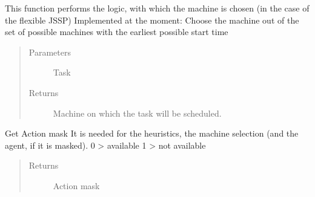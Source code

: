 \documentclass[letterpaper,10pt,english]{sphinxmanual}
\begin{document}
\begin{fulllineitems}
\begin{fulllineitems}
\label{\detokenize{environments:environments.env_tetris_scheduling.Env.choose_machine}}
\sphinxAtStartPar
This function performs the logic, with which the machine is chosen (in the case of the flexible JSSP)
Implemented at the moment: Choose the machine out of the set of possible machines with the earliest possible
start time
\begin{quote}\begin{description}
\item[{Parameters}] \leavevmode
\sphinxAtStartPar
{} \textendash{} Task

\item[{Returns}] \leavevmode
\sphinxAtStartPar
Machine on which the task will be scheduled.

\end{description}\end{quote}

\end{fulllineitems}


\begin{fulllineitems}
\label{\detokenize{environments:environments.env_tetris_scheduling.Env.get_action_mask}}
\sphinxAtStartPar
Get Action mask
It is needed for the heuristics, the machine selection (and the agent, if it is masked).
0 \sphinxhyphen{}\textgreater{} available
1 \sphinxhyphen{}\textgreater{} not available
\begin{quote}\begin{description}
\item[{Returns}] \leavevmode
\sphinxAtStartPar
Action mask

\end{description}\end{quote}

\end{fulllineitems}



\end{fulllineitems}
\end{document}
